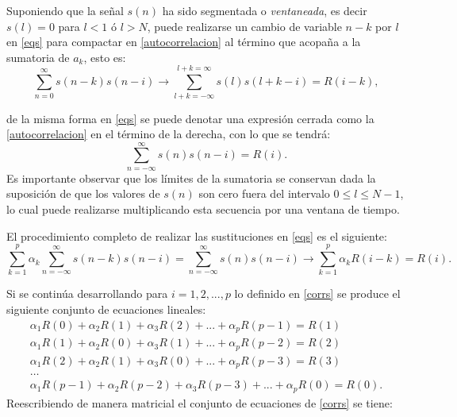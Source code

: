 Suponiendo que la señal $s(n)$ ha sido segmentada o \emph{ventaneada}, es decir $s(l)=0$ para $l<1$ ó $l>N$, 
puede realizarse un cambio de variable $n-k$ por $l$ en \eqref{eqs} para compactar en \eqref{autocorrelacion} al término que acopaña a la sumatoria de $a_k$, esto es:
$$\sum_{n=0}^\infty s(n-k)s(n-i) \rightarrow \sum_{l+k=-\infty}^{l+k=\infty} s(l)s(l+k-i) = R(i-k),$$

de la misma forma en \eqref{eqs} se puede denotar una expresión cerrada como la \eqref{autocorrelacion} en el término de la derecha, con lo que se tendrá:
$$\sum_{n=-\infty}^\infty s(n)s(n-i) = R(i).$$
Es importante observar que los límites de la sumatoria se conservan dada la suposición de que los valores de $s(n)$ son cero fuera del intervalo $0\le l \le N-1$, lo cual puede realizarse multiplicando esta secuencia por una ventana de tiempo.

El procedimiento completo de realizar las sustituciones en \eqref{eqs} es el siguiente:
\begin{equation}\label{corrs}
\sum_{k=1}^p \alpha_k \sum_{n=-\infty}^\infty s(n-k)s(n-i)=\sum_{n=-\infty}^\infty s(n)s(n-i) \rightarrow \sum_{k=1}^p \alpha_k R(i-k)=R(i).
\end{equation}

 Si se continúa desarrollando para $i=1, 2, ..., p$ lo definido en \eqref{corrs} se produce el siguiente conjunto de ecuaciones lineales:
\begin{eqnarray*}
\alpha_1R(0)+\alpha_2R(1)+\alpha_3R(2)+...+\alpha_p R(p-1)=R(1) \\
\alpha_1R(1)+\alpha_2R(0)+\alpha_3R(1)+...+\alpha_p R(p-2)=R(2) \\
\alpha_1R(2)+\alpha_2R(1)+\alpha_3R(0)+...+\alpha_p R(p-3)=R(3) \\
\hdots  \\
\alpha_1R(p-1)+\alpha_2R(p-2)+\alpha_3R(p-3)+...+\alpha_p R(0)=R(0).
\end{eqnarray*}
\clearpage
Reescribiendo de manera matricial el conjunto de ecuaciones de \eqref{corrs} se tiene:

